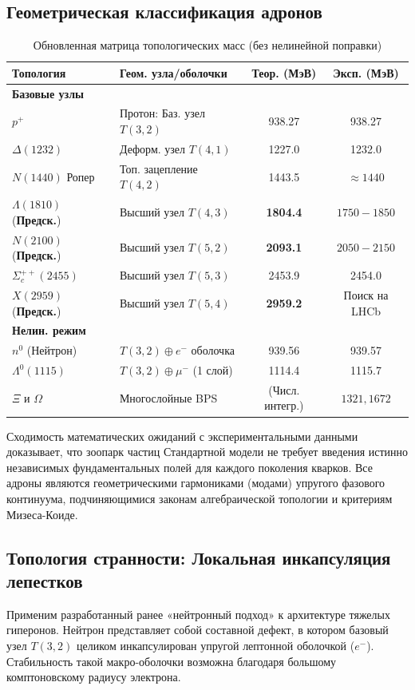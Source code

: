 \documentclass[12pt,a4paper]{article}
\begin{document}
	\subsection{Геометрическая классификация адронов}
	
	\begin{table}[htbp]
		\centering
		\caption{Обновленная матрица топологических масс (без нелинейной поправки)}
		\renewcommand{\arraystretch}{1.3}
		\begin{tabular}{llcc}
			\toprule
			\textbf{Топология} & \textbf{Геом. узла/оболочки} & \textbf{Теор. (МэВ)} & \textbf{Эксп. (МэВ)}\\
			\midrule
			\textbf{Базовые узлы} \\
			$p^+$ & Протон: Баз. узел $T(3,2)$ & 938.27 & 938.27 \\
			$\Delta(1232)$ & Деформ. узел $T(4,1)$ & 1227.0 & 1232.0 \\
			$N(1440)$ Ропер & Топ. зацепление $T(4,2)$ & 1443.5 & $\approx 1440$ \\
			$\Lambda(1810)$ (\textbf{Предск.}) & Высший узел $T(4,3)$ & \textbf{1804.4} & $1750-1850$ \\
			$N(2100)$ (\textbf{Предск.}) & Высший узел $T(5,2)$ & \textbf{2093.1} & $2050-2150$ \\
			$\Sigma_c^{++}(2455)$ & Высший узел $T(5,3)$ & 2453.9 & 2454.0 \\
			$X(2959)$ (\textbf{Предск.}) & Высший узел $T(5,4)$ & \textbf{2959.2} & Поиск на LHCb \\
			\midrule
			\textbf{Нелин. режим} \\
			$n^0$ (Нейтрон) & $T(3,2) \oplus e^-$ оболочка & 939.56 & 939.57 \\
			$\Lambda^0(1115)$ & $T(3,2) \oplus \mu^-$ (1 слой) & 1114.4 & 1115.7 \\
			$\Xi$ и $\Omega$ & Многослойные BPS & (Числ. интегр.) & $1321, 1672$ \\
			\bottomrule
		\end{tabular}
		\label{tab:zoo_strict}
	\end{table}

	Сходимость математических ожиданий с экспериментальными данными доказывает, что зоопарк частиц Стандартной модели не требует введения истинно независимых фундаментальных полей для каждого поколения кварков. Все адроны являются геометрическими гармониками (модами) упругого фазового континуума, подчиняющимися законам алгебраической топологии и критериям Мизеса-Коиде.
	
	\subsection{Топология странности: Локальная инкапсуляция лепестков}
	Применим разработанный ранее «нейтронный подход» к архитектуре тяжелых гиперонов. Нейтрон представляет собой составной дефект, в котором базовый узел $T(3,2)$ целиком инкапсулирован упругой лептонной оболочкой ($e^-$). Стабильность такой макро-оболочки возможна благодаря большому комптоновскому радиусу электрона.
	
\end{document}
